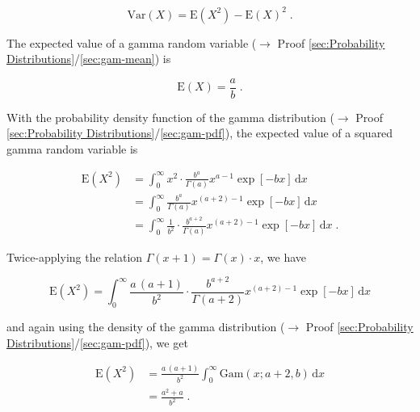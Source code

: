 \documentclass[a4paper,12pt,twoside]{book}
\begin{document}
\begin{equation} \label{eq:gam-var-var-mean}
\mathrm{Var}(X) = \mathrm{E}(X^2) - \mathrm{E}(X)^2 \; .
\end{equation}

The expected value of a gamma random variable ($\rightarrow$ Proof \ref{sec:Probability Distributions}/\ref{sec:gam-mean}) is

\begin{equation} \label{eq:gam-var-gam-mean}
\mathrm{E}(X) = \frac{a}{b} \; .
\end{equation}

With the probability density function of the gamma distribution ($\rightarrow$ Proof \ref{sec:Probability Distributions}/\ref{sec:gam-pdf}), the expected value of a squared gamma random variable is

\begin{equation} \label{eq:gam-var-gam-sqr-mean-s1}
\begin{split}
\mathrm{E}(X^2) &= \int_{0}^{\infty} x^2 \cdot \frac{b^a}{\Gamma(a)} x^{a-1} \exp[-b x] \, \mathrm{d}x \\
&= \int_{0}^{\infty} \frac{b^a}{\Gamma(a)} x^{(a+2)-1} \exp[-b x] \, \mathrm{d}x \\
&= \int_{0}^{\infty} \frac{1}{b^2} \cdot \frac{b^{a+2}}{\Gamma(a)} x^{(a+2)-1} \exp[-b x] \, \mathrm{d}x \; .
\end{split}
\end{equation}

Twice-applying the relation $\Gamma(x+1) = \Gamma(x) \cdot x$, we have

\begin{equation} \label{eq:gam-var-gam-sqr-mean-s2}
\mathrm{E}(X^2) = \int_{0}^{\infty} \frac{a \, (a+1)}{b^2} \cdot \frac{b^{a+2}}{\Gamma(a+2)} x^{(a+2)-1} \exp[-b x] \, \mathrm{d}x
\end{equation}

and again using the density of the gamma distribution ($\rightarrow$ Proof \ref{sec:Probability Distributions}/\ref{sec:gam-pdf}), we get

\begin{equation} \label{eq:gam-var-gam-sqr-mean-s3}
\begin{split}
\mathrm{E}(X^2) &= \frac{a \, (a+1)}{b^2} \int_{0}^{\infty} \mathrm{Gam}(x; a+2, b) \, \mathrm{d}x \\
&= \frac{a^2+a}{b^2} \; .
\end{split}
\end{equation}
\end{document}
